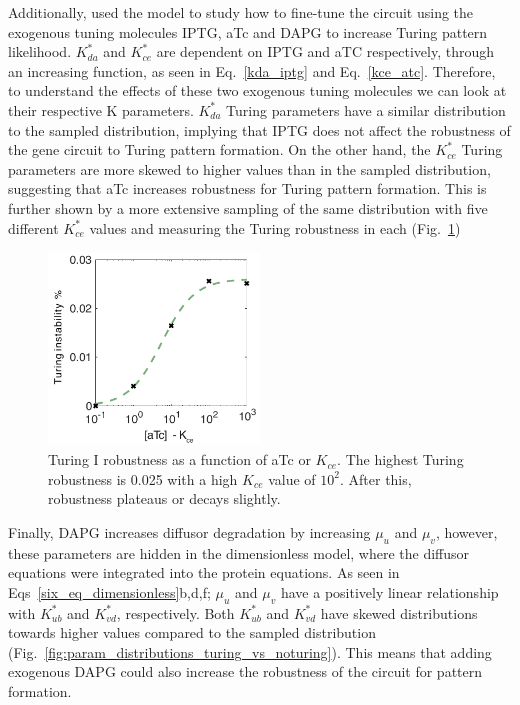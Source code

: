 Additionally, used the model to study how to fine-tune the circuit using the exogenous tuning molecules IPTG, aTc and DAPG to increase Turing pattern likelihood.
$K_{da}^*$  and $K_{ce}^*$ are dependent on IPTG and aTC respectively, through an increasing function,
as seen in Eq.~\ref{kda_iptg} and Eq.~\ref{kce_atc}.
Therefore,
to understand the effects of these two exogenous tuning molecules we can look at their respective K parameters.
$K_{da}^*$ Turing parameters have a similar distribution to the sampled distribution,
implying that IPTG does not affect the robustness of the gene circuit to Turing pattern formation.
On the other hand, the $K_{ce}^*$ Turing parameters are more skewed to higher values than in the sampled distribution,
suggesting that aTc increases robustness for Turing pattern formation.
This is further shown by a more extensive sampling of the same distribution with five different $K_{ce}^*$ values
and measuring the Turing robustness in each
(Fig.~\ref{fig:atc_robustness})

\begin{figure}[H] %
    \centering
    \begin{adjustbox}{center}
        \includegraphics[width=0.5\textwidth]{chapters/Chapter 2/atc_robustness} %
    \end{adjustbox}
    \caption{Turing I robustness as a function of aTc or $K_{ce}$. The highest Turing robustness is 0.025 with a high $K_{ce}$ value of $10^2$. After this, robustness plateaus or decays slightly. }
    \label{fig:atc_robustness} %
\end{figure}

Finally, DAPG increases diffusor degradation by increasing $\mu_u$ and $\mu_v$,
however, these parameters are hidden in the dimensionless model,
where the diffusor equations were integrated into the protein equations.
As seen in Eqs~\ref{six_eq_dimensionless}b,d,f; $\mu_u$
and $\mu_v$ have a positively linear relationship with $K_{ub}^*$ and $K_{vd}^*$, respectively.
Both $K_{ub}^*$ and $K_{vd}^*$ have skewed distributions towards higher values compared to the sampled distribution
(Fig.~\ref{fig:param_distributions_turing_vs_noturing}).
This means that adding exogenous DAPG could also increase the robustness of the circuit for pattern formation.

